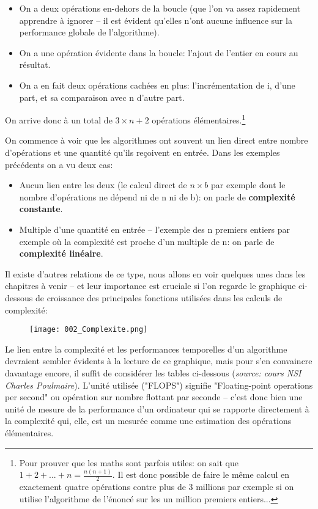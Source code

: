 \documentclass[12pt]{article}
\begin{document}
	\begin{MaReponse}
		\begin{itemize}
			\item On a deux opérations en-dehors de la boucle (que l'on va assez rapidement apprendre à ignorer -- il est évident qu'elles n'ont aucune influence sur la performance globale de l'algorithme).
			\item On a une opération évidente dans la boucle: l'ajout de l'entier en cours au résultat.
			\item On a en fait deux opérations cachées en plus: l'incrémentation de i, d'une part, et sa comparaison avec n d'autre part.
		\end{itemize}
		
		On arrive donc à un total de $3 \times n + 2$ opérations élémentaires.\footnote{Pour prouver que les maths sont parfois utiles: on sait que $1 + 2 + ... + n = \frac{n(n + 1)}{2}$. Il est donc possible de faire le même calcul en exactement quatre opérations contre plus de 3 millions par exemple si on utilise l'algorithme de l'énoncé sur les un million premiers entiers...}
	\end{MaReponse}
	
	On commence à voir que les algorithmes ont souvent un lien direct entre nombre d'opérations et une quantité qu'ils reçoivent en entrée. Dans les exemples précédents on a vu deux cas:
	\begin{itemize}
		\item Aucun lien entre les deux (le calcul direct de $n \times b$ par exemple dont le nombre d'opérations ne dépend ni de n ni de b): on parle de \textbf{complexité constante}.
		\item Multiple d'une quantité en entrée -- l'exemple des n premiers entiers par exemple où la complexité est proche d'un multiple de n: on parle de \textbf{complexité linéaire}.
	\end{itemize}
	
	Il existe d'autres relations de ce type, nous allons en voir quelques unes dans les chapitres à venir -- et leur importance est cruciale si l'on regarde le graphique ci-dessous de croissance des principales fonctions utilisées dans les calculs de complexité:
	
	\begin{figure}[H]
		\centering
		\texttt{[image: 002\_Complexite.png]}
	\end{figure}
	
	Le lien entre la complexité et les performances temporelles d'un algorithme devraient sembler évidents à la lecture de ce graphique, mais pour s'en convaincre davantage encore, il suffit de considérer les tables ci-dessous (\textit{source: cours NSI Charles Poulmaire}). L'unité utilisée ("FLOPS") signifie "Floating-point operations per second" ou opération sur nombre flottant par seconde -- c'est donc bien une unité de mesure de la performance d'un ordinateur qui se rapporte directement à la complexité qui, elle, est un mesurée comme une estimation des opérations élémentaires.
	
\end{document}
